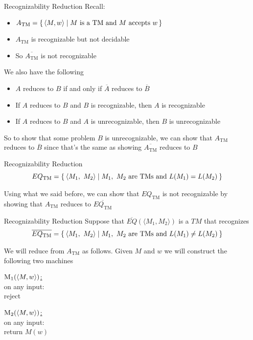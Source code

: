 \documentclass[aspectratio=169]{beamer}
\begin{document}
\begin{frame}{Recognizability Reduction}
    Recall:
    \begin{itemize}
        \item $A_{\text{TM}} = \set{\langle M, w \rangle | \text{$M$ is a TM and $M$ accepts $w$}}$ 
        \item $A_{\text{TM}}$ is recognizable but not decidable
        \item So $\overline{A_{\text{TM}}}$ is not recognizable
    \end{itemize} \pause
    We also have the following
    \begin{itemize}
        \item $A$ reduces to $B$ if and only if $\overline{A}$ reduces to $\overline{B}$ \pause
        \item If $A$ reduces to $B$ and $B$ is recognizable, then $A$ is recognizable \pause
        \item If $A$ reduces to $B$ and $A$ is unrecognizable, then $B$ is unrecognizable \pause
    \end{itemize}
    
    So to show that some problem $B$ is unrecognizable, we can show that $A_{\text{TM}}$ reduces to $\overline{B}$ since that's the same as showing $\overline{A_{\text{TM}}}$ reduces to $B$    
\end{frame}

\begin{frame}{Recognizability Reduction}
    $$
        EQ_{\text{TM}} = \Set{\langle M_1,\ M_2 \rangle | M_1,\ M_2 \text{ are TMs and } L(M_1) = L(M_2) }
    $$ \pause

    Using what we said before, we can show that $EQ_{\text{TM}}$ is not recognizable by showing that $A_{\text{TM}}$ reduces to $\overline{EQ_{\text{TM}}}$
    
\end{frame}

\begin{frame}{Recognizability Reduction}
    Suppose that $\overline{EQ}(\langle M_1, M_2 \rangle)$ is a $TM$ that recognizes 
    $$\overline{EQ_{\text{TM}}} = \Set{\langle M_1,\ M_2 \rangle | M_1,\ M_2 \text{ are TMs and } L(M_1) \neq L(M_2) }$$ \pause

    We will reduce from $A_{\text{TM}}$ as follows. Given $M$ and $w$ we will construct the following two machines \pause

    \begin{algo}
        \underline{$\textsc{M}_1(\langle M, w \rangle)$:}\+
    \\      on any input:\+
    \\          reject
    \end{algo}

    \pause

    \begin{algo}
        \underline{$\textsc{M}_2(\langle M, w \rangle)$:}\+
    \\      on any input:\+
    \\          return $M(w)$
    \end{algo}
\end{frame}
\end{document}
